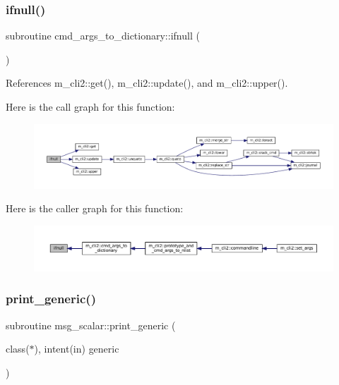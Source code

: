 \subsubsection{\texorpdfstring{ifnull()}{ifnull()}}
{\footnotesize\ttfamily subroutine cmd\+\_\+args\+\_\+to\+\_\+dictionary\+::ifnull (\begin{DoxyParamCaption}{ }\end{DoxyParamCaption})\hspace{0.3cm}{\ttfamily [private]}}



References m\+\_\+cli2\+::get(), m\+\_\+cli2\+::update(), and m\+\_\+cli2\+::upper().

Here is the call graph for this function\+:
\nopagebreak
\begin{figure}[H]
\begin{center}
\leavevmode
\includegraphics[width=350pt]{M__CLI2_8f90_aa26f90016621d1ee43d3b5b66316532b_cgraph}
\end{center}
\end{figure}
Here is the caller graph for this function\+:
\nopagebreak
\begin{figure}[H]
\begin{center}
\leavevmode
\includegraphics[width=350pt]{M__CLI2_8f90_aa26f90016621d1ee43d3b5b66316532b_icgraph}
\end{center}
\end{figure}
\mbox{\label{M__CLI2_8f90_aaa8ee15f943d8e1543ae35ab732c3cd2}} 
\subsubsection{\texorpdfstring{print\+\_\+generic()}{print\_generic()}\hspace{0.1cm}{\footnotesize\ttfamily [1/2]}}
{\footnotesize\ttfamily subroutine msg\+\_\+scalar\+::print\+\_\+generic (\begin{DoxyParamCaption}\item[{class($\ast$), intent(in)}]{generic }\end{DoxyParamCaption})\hspace{0.3cm}{\ttfamily [private]}}

